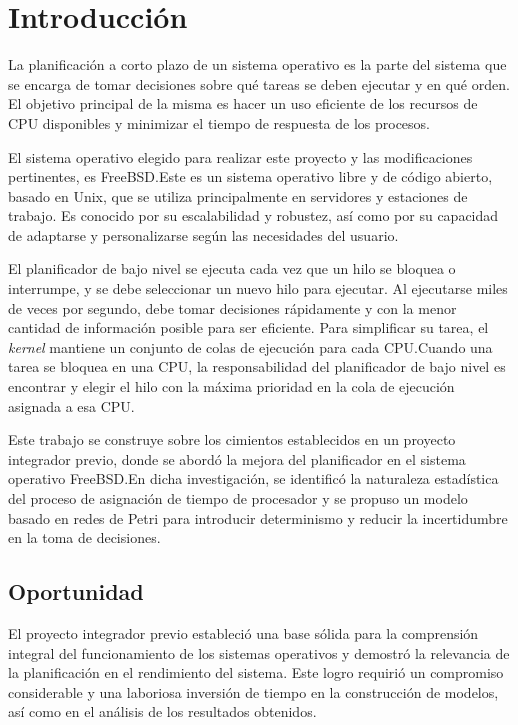 \chapter{Introducción}
La planificación a corto plazo de un sistema operativo es la parte del sistema que se encarga de tomar decisiones sobre qué tareas se deben ejecutar y en qué orden. El objetivo principal de la misma es hacer un uso eficiente de los recursos de CPU disponibles y minimizar el tiempo de respuesta de los procesos.\par

El sistema operativo elegido para realizar este proyecto y las modificaciones pertinentes, es FreeBSD.\@ Este es un sistema operativo libre y de código abierto, basado en Unix, que se utiliza principalmente en servidores y estaciones de trabajo. Es conocido por su escalabilidad y robustez, así como por su capacidad de adaptarse y personalizarse según las necesidades del usuario.\par

El planificador de bajo nivel se ejecuta cada vez que un hilo se bloquea o interrumpe, y se debe seleccionar un nuevo hilo para ejecutar. Al ejecutarse miles de veces por segundo, debe tomar decisiones rápidamente y con la menor cantidad de información posible para ser eficiente. Para simplificar su tarea, el \textit{kernel} mantiene un conjunto de colas de ejecución para cada CPU.\@ Cuando una tarea se bloquea en una CPU, la responsabilidad del planificador de bajo nivel es encontrar y elegir el hilo con la máxima prioridad en la cola de ejecución asignada a esa CPU.\par

Este trabajo se construye sobre los cimientos establecidos en un proyecto integrador previo, donde se abordó la mejora del planificador en el sistema operativo FreeBSD.\@ En dicha investigación\cite{bib1}, se identificó la naturaleza estadística del proceso de asignación de tiempo de procesador y se propuso un modelo basado en redes de Petri para introducir determinismo y reducir la incertidumbre en la toma de decisiones.\par

\section{Oportunidad}
El proyecto integrador previo estableció una base sólida para la comprensión integral del funcionamiento de los sistemas operativos y demostró la relevancia de la planificación en el rendimiento del sistema. Este logro requirió un compromiso considerable y una laboriosa inversión de tiempo en la construcción de modelos, así como en el análisis de los resultados obtenidos.\par

